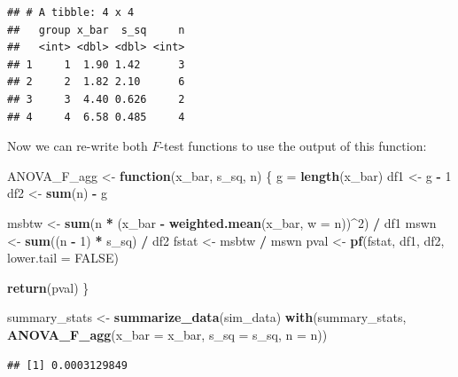 \documentclass[
]{book}
\newenvironment{Shaded}{\begin{snugshade}}{\end{snugshade}}
\newcommand{\AttributeTok}[1]{\textcolor[rgb]{0.13,0.29,0.53}{#1}}
\newcommand{\ConstantTok}[1]{\textcolor[rgb]{0.56,0.35,0.01}{#1}}
\newcommand{\ControlFlowTok}[1]{\textcolor[rgb]{0.13,0.29,0.53}{\textbf{#1}}}
\newcommand{\DecValTok}[1]{\textcolor[rgb]{0.00,0.00,0.81}{#1}}
\newcommand{\FunctionTok}[1]{\textcolor[rgb]{0.13,0.29,0.53}{\textbf{#1}}}
\newcommand{\NormalTok}[1]{#1}
\newcommand{\OtherTok}[1]{\textcolor[rgb]{0.56,0.35,0.01}{#1}}
\newcommand{\SpecialCharTok}[1]{\textcolor[rgb]{0.81,0.36,0.00}{\textbf{#1}}}
\begin{document}
\begin{verbatim}
## # A tibble: 4 x 4
##   group x_bar  s_sq     n
##   <int> <dbl> <dbl> <int>
## 1     1  1.90 1.42      3
## 2     2  1.82 2.10      6
## 3     3  4.40 0.626     2
## 4     4  6.58 0.485     4
\end{verbatim}

Now we can re-write both \(F\)-test functions to use the output of this function:

\begin{Shaded}
\begin{Highlighting}[]
\NormalTok{ANOVA\_F\_agg }\OtherTok{\textless{}{-}} \ControlFlowTok{function}\NormalTok{(x\_bar, s\_sq, n) \{}
\NormalTok{  g }\OtherTok{=} \FunctionTok{length}\NormalTok{(x\_bar)}
\NormalTok{  df1 }\OtherTok{\textless{}{-}}\NormalTok{ g }\SpecialCharTok{{-}} \DecValTok{1}
\NormalTok{  df2 }\OtherTok{\textless{}{-}} \FunctionTok{sum}\NormalTok{(n) }\SpecialCharTok{{-}}\NormalTok{ g}
  
\NormalTok{  msbtw }\OtherTok{\textless{}{-}} \FunctionTok{sum}\NormalTok{(n }\SpecialCharTok{*}\NormalTok{ (x\_bar }\SpecialCharTok{{-}} \FunctionTok{weighted.mean}\NormalTok{(x\_bar, }\AttributeTok{w =}\NormalTok{ n))}\SpecialCharTok{\^{}}\DecValTok{2}\NormalTok{) }\SpecialCharTok{/}\NormalTok{ df1}
\NormalTok{  mswn }\OtherTok{\textless{}{-}} \FunctionTok{sum}\NormalTok{((n }\SpecialCharTok{{-}} \DecValTok{1}\NormalTok{) }\SpecialCharTok{*}\NormalTok{ s\_sq) }\SpecialCharTok{/}\NormalTok{ df2}
\NormalTok{  fstat }\OtherTok{\textless{}{-}}\NormalTok{ msbtw }\SpecialCharTok{/}\NormalTok{ mswn}
\NormalTok{  pval }\OtherTok{\textless{}{-}} \FunctionTok{pf}\NormalTok{(fstat, df1, df2, }\AttributeTok{lower.tail =} \ConstantTok{FALSE}\NormalTok{)}
 
  \FunctionTok{return}\NormalTok{(pval)}
\NormalTok{\}}

\NormalTok{summary\_stats }\OtherTok{\textless{}{-}} \FunctionTok{summarize\_data}\NormalTok{(sim\_data)}
\FunctionTok{with}\NormalTok{(summary\_stats, }\FunctionTok{ANOVA\_F\_agg}\NormalTok{(}\AttributeTok{x\_bar =}\NormalTok{ x\_bar, }\AttributeTok{s\_sq =}\NormalTok{ s\_sq, }\AttributeTok{n =}\NormalTok{ n))}
\end{Highlighting}
\end{Shaded}

\begin{verbatim}
## [1] 0.0003129849
\end{verbatim}
\end{document}
